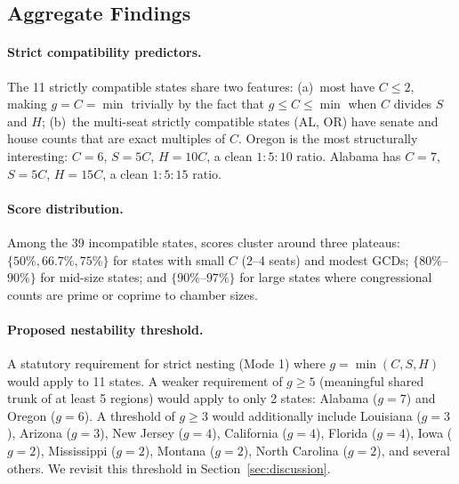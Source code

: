 \subsection{Aggregate Findings}

\paragraph{Strict compatibility predictors.}  The 11 strictly compatible
states share two features: (a)~most have $C \leq 2$, making $g = C = \min$
trivially by the fact that $g \leq C \leq \min$ when $C$ divides $S$ and $H$;
(b)~the multi-seat strictly compatible states (AL, OR) have senate and house
counts that are exact multiples of $C$.  Oregon is the most structurally
interesting: $C = 6$, $S = 5C$, $H = 10C$, a clean $1:5:10$ ratio.
Alabama has $C = 7$, $S = 5C$, $H = 15C$, a clean $1:5:15$ ratio.

\paragraph{Score distribution.}  Among the 39 incompatible states, scores
cluster around three plateaus: $\{50\%, 66.7\%, 75\%\}$ for states with
small $C$ (2--4 seats) and modest GCDs; $\{80\%$--$90\%\}$ for mid-size
states; and $\{90\%$--$97\%\}$ for large states where congressional counts
are prime or coprime to chamber sizes.

\paragraph{Proposed nestability threshold.}  A statutory requirement for strict
nesting (Mode 1) where $g = \min(C,S,H)$ would apply to 11 states.  A weaker
requirement of $g \geq 5$ (meaningful shared trunk of at least 5 regions)
would apply to only 2 states: Alabama ($g=7$) and Oregon ($g=6$).  A
threshold of $g \geq 3$ would additionally include Louisiana ($g=3$), Arizona
($g=3$), New Jersey ($g=4$), California ($g=4$), Florida ($g=4$), Iowa ($g=2$),
Mississippi ($g=2$), Montana ($g=2$), North Carolina ($g=2$), and several others.
We revisit this threshold in Section~\ref{sec:discussion}.

